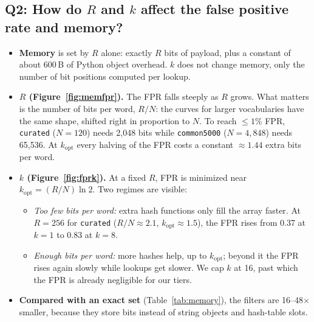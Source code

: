 \documentclass[11pt]{article}
\newcommand{\code}[1]{\texttt{#1}}
\begin{document}
\subsection{\texorpdfstring{Q2: How do $R$ and $k$ affect}{Q2: How do R and k affect} the false positive rate and memory?}
\begin{itemize}
  \item \textbf{Memory} is set by $R$ alone: exactly $R$ bits of payload, plus a constant of about
        600\,B of Python object overhead. $k$ does not change memory, only the number of bit
        positions computed per lookup.
  \item \textbf{$R$ (Figure~\ref{fig:memfpr}).} The FPR falls steeply as $R$ grows. What matters is
        the number of bits per word, $R/N$: the curves for larger vocabularies have the same shape,
        shifted right in proportion to $N$. To reach $\le 1\%$ FPR, \code{curated} ($N=120$) needs
        2{,}048 bits while \code{common5000} ($N=4{,}848$) needs 65{,}536. At $k_{\mathrm{opt}}$ every
        halving of the FPR costs a constant $\approx 1.44$ extra bits per word.
  \item \textbf{$k$ (Figure~\ref{fig:fprk}).} At a fixed $R$, FPR is minimized near
        $k_{\mathrm{opt}} = (R/N)\ln 2$. Two regimes are visible:
        \begin{itemize}
          \item \emph{Too few bits per word:} extra hash functions only fill the array faster. At
                $R=256$ for \code{curated} ($R/N\approx 2.1$, $k_{\mathrm{opt}}\approx 1.5$), the FPR
                rises from 0.37 at $k=1$ to 0.83 at $k=8$.
          \item \emph{Enough bits per word:} more hashes help, up to $k_{\mathrm{opt}}$; beyond it the
                FPR rises again slowly while lookups get slower. We cap $k$ at 16, past which the FPR
                is already negligible for our tiers.
        \end{itemize}
  \item \textbf{Compared with an exact set} (Table~\ref{tab:memory}), the filters are 16--48$\times$
        smaller, because they store bits instead of string objects and hash-table slots.
\end{itemize}

\end{document}
